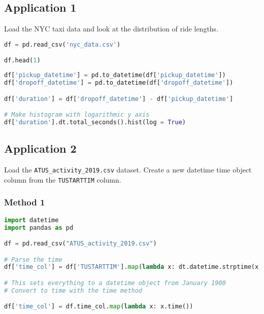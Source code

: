 \subsection{Application 1}
Load the NYC taxi data and look at the distribution of ride lengths. 

\begin{lstlisting}[language = Python]
df = pd.read_csv('nyc_data.csv')

df.head(1)
\end{lstlisting}

\begin{lstlisting}[language = Python]
df['pickup_datetime'] = pd.to_datetime(df['pickup_datetime'])
df['dropoff_datetime'] = pd.to_datetime(df['dropoff_datetime'])

df['duration'] = df['dropoff_datetime'] - df['pickup_datetime']

# Make histogram with logarithmic y axis
df['duration'].dt.total_seconds().hist(log = True)
\end{lstlisting}


\subsection{Application 2}

Load the \texttt{ATUS\_activity\_2019.csv} dataset. Create a new datetime time object column from the \texttt{TUSTARTTIM} column.

\subsubsection{Method 1}
\begin{lstlisting}[language = Python]
import datetime
import pandas as pd

df = pd.read_csv("ATUS_activity_2019.csv")

# Parse the time
df['time_col'] = df['TUSTARTTIM'].map(lambda x: dt.datetime.strptime(x, "%H:%M:%S"))

# This sets everything to a datetime object from January 1900
# Convert to time with the time method

df['time_col'] = df.time_col.map(lambda x: x.time())
\end{lstlisting}
